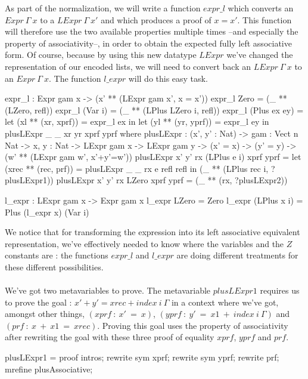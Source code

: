 \documentclass{sigplanconf}
\begin{document}
As part of the normalization, we will write a function $expr\_l$ which converts an $Expr\ \Gamma\ x$ to a $LExpr\ \Gamma\ x'$ and which produces a proof of $x=x'$. This function will therefore use the two available properties multiple times --and especially the property of associativity--, in order to obtain the expected fully left associative form. Of course, because by using this new datatype $LExpr$ we've changed the representation of our encoded lists, we will need to convert back an $LExpr\ \Gamma\ x$ to an $Expr\ \Gamma\ x$. The function $l\_expr$ will do this easy task.

\begin{code}[caption=Production of the left associative form, captionpos=b, label=lst1:haskell2]
expr_l : Expr gam x 
         -> (x' ** (LExpr gam x', x = x'))
expr_l Zero = (_ ** (LZero, refl))
expr_l (Var i) = (_ ** (LPlus LZero i, refl))
expr_l (Plus ex ey) = 
  let (xl ** (xr, xprf)) = expr_l ex in
  let (yl ** (yr, yprf)) = expr_l ey in
    plusLExpr _ _ xr yr xprf yprf
      where 
      plusLExpr : (x', y' : Nat)
            -> {gam : Vect n Nat} -> {x, y : Nat} 
            -> LExpr gam x -> LExpr gam y 
            -> (x' = x) -> (y' = y) 
            -> (w' ** (LExpr gam w', x'+y'=w'))
      plusLExpr x' y' rx (LPlus e i) xprf yprf =
        let (xrec ** (rec, prf)) = 
          plusLExpr _ _ rx e refl refl in
          (_ ** (LPlus rec i, ?plusLExpr1))
      plusLExpr x' y' rx LZero xprf yprf =
        (_ ** (rx, ?plusLExpr2))

l_expr : LExpr gam x -> Expr gam x
l_expr LZero = Zero
l_expr (LPlus x i) = Plus (l_expr x) (Var i)
\end{code}

We notice that for transforming the expression into its left associative equivalent representation, we've effectively needed to know where the variables and the $Z$ constants are : the functions $expr\_l$ and $l\_expr$ are doing different treatments for these different possibilities. \\
\\
We've got two metavariables to prove. The metavariable $plusLExpr1$ requires us to prove the goal : $x' + y' = xrec + index\ i\ \Gamma$ in a context where we've got, amongst other things,  $(xprf\ :\ x'\ =\ x)$, $(yprf\ :\ y'\ =\ x1\ +\ index\ i\ \Gamma)$ and $(prf\ :\ x\ +\ x1\ =\ xrec)$.
Proving this goal uses the property of associativity after rewriting the goal with these three proof of equality $xprf$, $yprf$ and $prf$.

\begin{code}[caption=Proof of the metavariable plusLExpr1, captionpos=b, label=lst1:haskell2]
plusLExpr1 = proof {
  intros;
  rewrite sym xprf;
  rewrite sym yprf;
  rewrite prf;
  mrefine plusAssociative;
}
\end{code}
\end{document}

